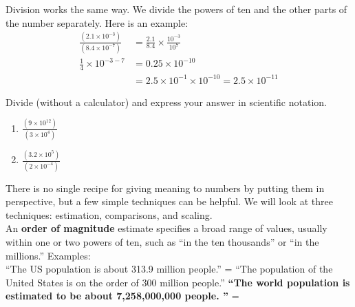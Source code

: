 \documentclass[12pt]{article}
\begin{document}
\pagebreak
Division works the same way.
We divide the powers of ten and the other parts of the number separately.  Here is an example:
\begin{equation}
\begin{split}
\frac{(2.1 \times 10^{-3})}{(8.4 \times 10^{-7})} &= \frac{2.1}{8.4} \times \frac{10^{-3}}{10^{7}} \\
\frac{1}{4} \times 10^{-3-7} &= 0.25 \times 10^{-10} \\
&= 2.5 \times 10^{-1} \times 10^{-10} = 2.5 \times 10^{-11}
\end{split}
\end{equation}


Divide (without a calculator) and express your answer in scientific notation.
\begin{enumerate}
\item \Large $\frac{(9 \times 10^{12})}{(3 \times 10^{4})} $
\vspace{0.5in}
\item $\frac{(3.2 \times 10^{5})}{(2\times 10^{-4})}$ 	
\end{enumerate}
\vspace{0.5in}


There is no single recipe for giving meaning to numbers by putting them in perspective, but a few simple techniques can be helpful.  We will look at three techniques: estimation, comparisons, and scaling.\\


An \textbf{order of magnitude} estimate specifies a broad range of values, usually within one or two powers of ten, such as “in the ten thousands” or “in the millions.”  Examples:\\

``The US population is about 313.9 million people.'' = ``The population of the United States is on the order of 300 million people.''
\vspace{0.5in}
\textbf{``The world population is estimated to be about 7,258,000,000 people. ''} = 
\vspace{0.5in}
\end{document}
